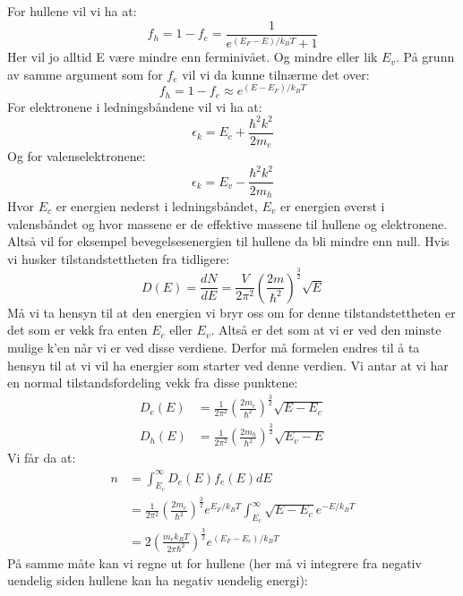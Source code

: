 \documentclass{article}
\begin{document}
For hullene vil vi ha at:
\begin{equation}
    f_h = 1 -f_e = \frac{1}{e^{(E_F - E)/ k_B T}  + 1}
\end{equation}
Her vil jo alltid E være mindre enn ferminivået. Og mindre eller lik $E_v$. På grunn av samme argument som for $f_e$ vil vi da kunne tilnærme det over:
\begin{equation}
    f_h = 1 - f_e \approx e^{(E - E_F)/ k_B T}
\end{equation}
For elektronene i ledningsbåndene vil vi ha at:
\begin{equation}
    \epsilon_k = E_c + \frac{\hbar^2 k^2}{2m_e}
\end{equation} Og for valenselektronene:
\begin{equation}
    \epsilon_k = E_v - \frac{\hbar^2 k^2}{2m_h}
\end{equation}
Hvor $E_c$ er energien nederst i ledningsbåndet, $E_v$ er energien øverst i valensbåndet og hvor massene er de effektive massene til hullene og elektronene. Altså vil for eksempel bevegelsesenergien til hullene da bli mindre enn null. Hvis vi husker tilstandstettheten fra tidligere:
\begin{equation}
    D(E) = \frac{dN}{dE} = \frac{V}{2\pi^2} \left(\frac{2m}{\hbar^2}\right)^{\frac{3}{2}}\sqrt{E}
\end{equation}
Må vi ta hensyn til at den energien vi bryr oss om for denne tilstandstettheten er det som er vekk fra enten $E_c$ eller $E_v$. Altså er det som at vi er ved den minste mulige k'en når vi er ved disse verdiene. Derfor må formelen endres til å ta hensyn til at vi vil ha energier som starter ved denne verdien. Vi antar at vi har en normal tilstandsfordeling vekk fra disse punktene:
\begin{align}
    D_e(E) &= \frac{1}{2\pi^2} \left(\frac{2m_e}{\hbar^2}\right)^{\frac{3}{2}} \sqrt{E-E_c}\\
    D_h(E) &= \frac{1}{2\pi^2} \left(\frac{2m_h}{\hbar^2}\right)^{\frac{3}{2}} \sqrt{E_v - E}
\end{align}
Vi får da at:
\begin{align}
    n &= \int_{E_c}^\infty D_e(E) f_e(E) dE \\&=\frac{1}{2\pi^2} \left(\frac{2m_e}{\hbar^2}\right)^{\frac{3}{2}} e^{E_F / k_BT}\int_{E_c}^\infty \sqrt{E-E_c} e^{-E/k_BT} \\
    &= 2 \left(\frac{m_e k_BT}{2 \pi \hbar^2}\right)^{\frac{3}{2}} e^{(E_F - E_c) / k_BT}
\end{align}
På samme måte kan vi regne ut for hullene (her må vi integrere fra negativ uendelig siden hullene kan ha negativ uendelig energi):
\end{document}
